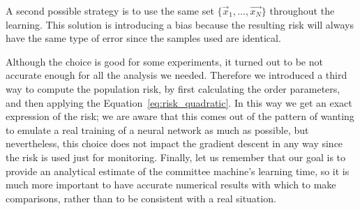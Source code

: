 A second possible strategy is to use the same set \(\{\vec{x}_1,\dots,\vec{x_N}\}\) 
throughout the learning. This solution is introducing a bias because the resulting risk
will always have the same type of error since the samples used are identical.

Although the choice is good for some experiments, it turned out to be not accurate enough
for all the analysis we needed. Therefore we introduced a third way to compute the population 
risk, by first calculating the order parameters, and then applying the Equation~\eqref{eq:risk_quadratic}.
In this way we get an exact expression of the risk;
we are aware that this comes out of the pattern of wanting to emulate a real training of a neural network as much as possible,
but nevertheless, this choice does not impact the gradient descent in any way since
the risk is used just for monitoring.
Finally, let us remember that our goal is to provide an analytical estimate of the committee machine's learning time,
so it is much more important to have accurate numerical results with which to make comparisons,
rather than to be consistent with a real situation.
